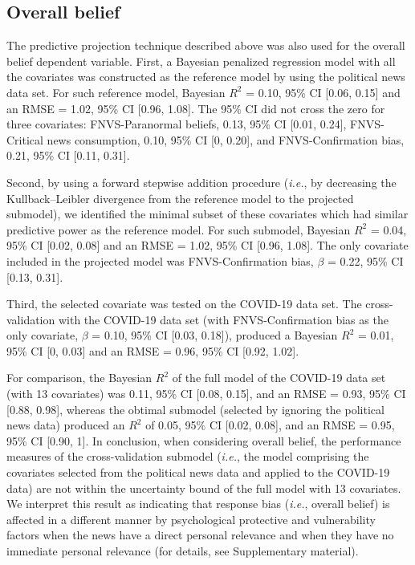 \documentclass[
  english,
  man,floatsintext]{apa6}
\begin{document}
\hypertarget{overall-belief}{%
\subsection{Overall belief}\label{overall-belief}}

The predictive projection technique described above was also used for the overall belief dependent variable. First, a Bayesian penalized regression model with all the covariates was constructed as the reference model by using the political news data set. For such reference model, Bayesian \(R^2\) = 0.10, 95\% CI {[}0.06, 0.15{]} and an RMSE = 1.02, 95\% CI {[}0.96, 1.08{]}. The 95\% CI did not cross the zero for three covariates: FNVS-Paranormal beliefs, 0.13, 95\% CI {[}0.01, 0.24{]}, FNVS-Critical news consumption, 0.10, 95\% CI {[}0, 0.20{]}, and FNVS-Confirmation bias, 0.21, 95\% CI {[}0.11, 0.31{]}.

Second, by using a forward stepwise addition procedure (\emph{i.e.}, by decreasing the Kullback--Leibler divergence from the reference model to the projected submodel), we identified the minimal subset of these covariates which had similar predictive power as the reference model. For such submodel, Bayesian \(R^2\) = 0.04, 95\% CI {[}0.02, 0.08{]} and an RMSE = 1.02, 95\% CI {[}0.96, 1.08{]}. The only covariate included in the projected model was FNVS-Confirmation bias, \(\beta\) = 0.22, 95\% CI {[}0.13, 0.31{]}.

Third, the selected covariate was tested on the COVID-19 data set. The cross-validation with the COVID-19 data set (with FNVS-Confirmation bias as the only covariate, \(\beta\) = 0.10, 95\% CI {[}0.03, 0.18{]}), produced a Bayesian \(R^2\) = 0.01, 95\% CI {[}0, 0.03{]} and an RMSE = 0.96, 95\% CI {[}0.92, 1.02{]}.

For comparison, the Bayesian \(R^2\) of the full model of the COVID-19 data set (with 13 covariates) was 0.11, 95\% CI {[}0.08, 0.15{]}, and an RMSE = 0.93, 95\% CI {[}0.88, 0.98{]}, whereas the obtimal submodel (selected by ignoring the political news data) produced an \(R^2\) of 0.05, 95\% CI {[}0.02, 0.08{]}, and an RMSE = 0.95, 95\% CI {[}0.90, 1{]}. In conclusion, when considering overall belief, the performance measures of the cross-validation submodel (\emph{i.e.}, the model comprising the covariates selected from the political news data and applied to the COVID-19 data) are not within the uncertainty bound of the full model with 13 covariates. We interpret this result as indicating that response bias (\emph{i.e.}, overall belief) is affected in a different manner by psychological protective and vulnerability factors when the news have a direct personal relevance and when they have no immediate personal relevance (for details, see Supplementary material).
\end{document}
